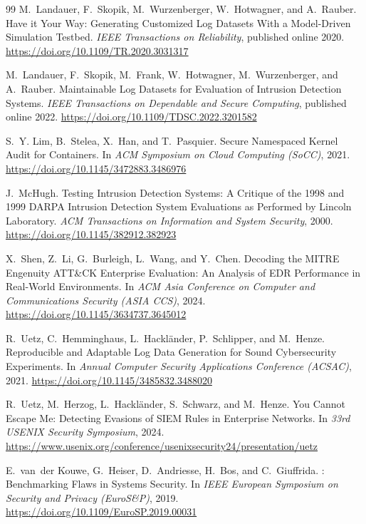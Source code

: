 \documentclass[11pt,a4paper]{article}
\begin{document}
\begin{thebibliography}{99}
M.~Landauer, F.~Skopik, M.~Wurzenberger, W.~Hotwagner, and A.~Rauber.
\newblock Have it Your Way: Generating Customized Log Datasets With a
  Model-Driven Simulation Testbed.
\newblock \emph{IEEE Transactions on Reliability}, published online 2020.
\newblock \url{https://doi.org/10.1109/TR.2020.3031317}

M.~Landauer, F.~Skopik, M.~Frank, W.~Hotwagner, M.~Wurzenberger, and
  A.~Rauber.
\newblock Maintainable Log Datasets for Evaluation of Intrusion Detection
  Systems.
\newblock \emph{IEEE Transactions on Dependable and Secure Computing},
  published online 2022.
\newblock \url{https://doi.org/10.1109/TDSC.2022.3201582}

S.~Y. Lim, B.~Stelea, X.~Han, and T.~Pasquier.
\newblock Secure Namespaced Kernel Audit for Containers.
\newblock In \emph{ACM Symposium on Cloud Computing (SoCC)}, 2021.
\newblock \url{https://doi.org/10.1145/3472883.3486976}

J.~McHugh.
\newblock Testing Intrusion Detection Systems: A Critique of the 1998 and 1999
  {DARPA} Intrusion Detection System Evaluations as Performed by Lincoln
  Laboratory.
\newblock \emph{ACM Transactions on Information and System Security}, 2000.
\newblock \url{https://doi.org/10.1145/382912.382923}

X.~Shen, Z.~Li, G.~Burleigh, L.~Wang, and Y.~Chen.
\newblock Decoding the {MITRE} Engenuity {ATT\&CK} Enterprise Evaluation: An
  Analysis of {EDR} Performance in Real-World Environments.
\newblock In \emph{ACM Asia Conference on Computer and Communications Security
  (ASIA CCS)}, 2024.
\newblock \url{https://doi.org/10.1145/3634737.3645012}

R.~Uetz, C.~Hemminghaus, L.~Hackl\"ander, P.~Schlipper, and M.~Henze.
\newblock Reproducible and Adaptable Log Data Generation for Sound
  Cybersecurity Experiments.
\newblock In \emph{Annual Computer Security Applications Conference (ACSAC)},
  2021.
\newblock \url{https://doi.org/10.1145/3485832.3488020}

R.~Uetz, M.~Herzog, L.~Hackl\"ander, S.~Schwarz, and M.~Henze.
\newblock You Cannot Escape Me: Detecting Evasions of {SIEM} Rules in
  Enterprise Networks.
\newblock In \emph{33rd USENIX Security Symposium}, 2024.
\newblock \url{https://www.usenix.org/conference/usenixsecurity24/presentation/uetz}

E.~van~der Kouwe, G.~Heiser, D.~Andriesse, H.~Bos, and C.~Giuffrida.
: Benchmarking Flaws in Systems Security.
\newblock In \emph{IEEE European Symposium on Security and Privacy
  (EuroS\&P)}, 2019.
\newblock \url{https://doi.org/10.1109/EuroSP.2019.00031}


\end{thebibliography}
\end{document}
